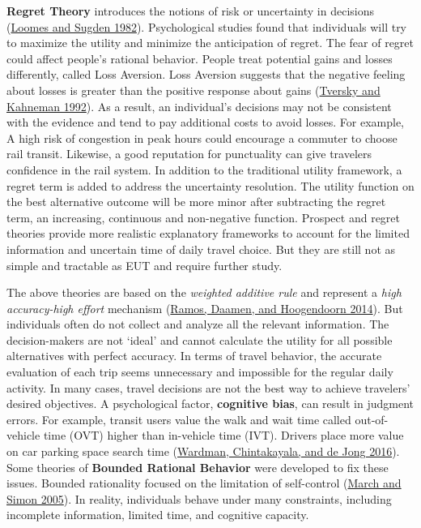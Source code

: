\documentclass[
  12pt,
]{article}
\begin{document}
\textbf{Regret Theory} introduces the notions of risk or uncertainty in decisions (\protect\hyperlink{ref-loomesRegretTheoryAlternative1982}{Loomes and Sugden 1982}). Psychological studies found that individuals will try to maximize the utility and minimize the anticipation of regret. The fear of regret could affect people's rational behavior. People treat potential gains and losses differently, called Loss Aversion. Loss Aversion suggests that the negative feeling about losses is greater than the positive response about gains (\protect\hyperlink{ref-tverskyAdvancesProspectTheory1992}{Tversky and Kahneman 1992}). As a result, an individual's decisions may not be consistent with the evidence and tend to pay additional costs to avoid losses. For example, A high risk of congestion in peak hours could encourage a commuter to choose rail transit. Likewise, a good reputation for punctuality can give travelers confidence in the rail system. In addition to the traditional utility framework, a regret term is added to address the uncertainty resolution. The utility function on the best alternative outcome will be more minor after subtracting the regret term, an increasing, continuous and non-negative function. Prospect and regret theories provide more realistic explanatory frameworks to account for the limited information and uncertain time of daily travel choice. But they are still not as simple and tractable as EUT and require further study.

The above theories are based on the \emph{weighted additive rule} and represent a \emph{high accuracy-high effort} mechanism (\protect\hyperlink{ref-ramosStateoftheArtReviewDevelopments2014}{Ramos, Daamen, and Hoogendoorn 2014}). But individuals often do not collect and analyze all the relevant information. The decision-makers are not `ideal' and cannot calculate the utility for all possible alternatives with perfect accuracy. In terms of travel behavior, the accurate evaluation of each trip seems unnecessary and impossible for the regular daily activity. In many cases, travel decisions are not the best way to achieve travelers' desired objectives. A psychological factor, \textbf{cognitive bias}, can result in judgment errors. For example, transit users value the walk and wait time called out-of-vehicle time (OVT) higher than in-vehicle time (IVT). Drivers place more value on car parking space search time (\protect\hyperlink{ref-wardmanValuesTravelTime2016}{Wardman, Chintakayala, and de Jong 2016}). Some theories of \textbf{Bounded Rational Behavior} were developed to fix these issues. Bounded rationality focused on the limitation of self-control (\protect\hyperlink{ref-marchCognitiveLimitsRationality2005}{March and Simon 2005}). In reality, individuals behave under many constraints, including incomplete information, limited time, and cognitive capacity.
\end{document}
